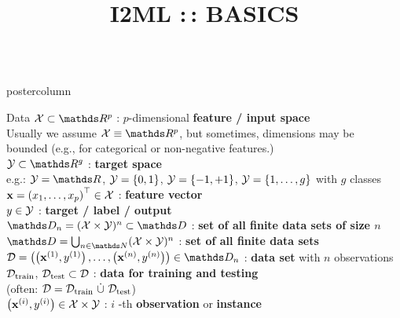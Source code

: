 \documentclass{beamer}
\title{I2ML :\,: BASICS} %
\newlength{\columnheight} %
\begin{document}
\begin{frame}[fragile]{}
\vspace{-8ex}
\begin{columns}
	\begin{column}{.31\textwidth}
		\begin{beamercolorbox}[center]{postercolumn}
			\begin{minipage}{.98\textwidth}
				\parbox[t][\columnheight]{\textwidth}{
\begin{myblock}{Data}
 $\Xspace \subset \R^p$ : $p$-dimensional \textbf{feature / input space}\\ 
Usually we assume $\Xspace \equiv \R^p$, but sometimes, dimensions may be \\  
bounded (e.g., for categorical or non-negative features.)    \\

$\Yspace \subset \R^g$ : \textbf{target space} \\ 
e.g.: $\Yspace = \R$, $\mathcal{Y} = \{0, 1\}$, $\mathcal{Y} = \{-1, +1\}$, $\mathcal{Y} = \{1, \ldots, g\}$ with $g$ classes\\

$\mathbf{x} = \left(x_1, \ldots, x_p\right)^\top \in \mathcal{X}$ : \textbf{feature vector} \\ 
 
$y \in \mathcal{Y}$ : \textbf{target / label / output} \\
 
$\allDatasetsn = \defAllDatasetsn \subset \allDatasets$ : \textbf{set of all finite data sets of size $n$} \\

$\allDatasets = \defAllDatasets$ : \textbf{set of all finite data sets} \\
 
$\D = \Dset \in \allDatasetsn $ : \textbf{data set} with $n$ observations \\
 
$\mathcal{D}_{\text{train}}$, $\mathcal{D}_{\text{test}} \subset \mathcal{D}$ : \textbf{data for training and testing} \\ 
(often: $\mathcal{D} = \mathcal{D}_{\text{train}} ~ \dot{\cup} ~ \mathcal{D}_{\text{test}}$)\\
 
$\left(\mathbf{x}^{(i)}, y^{(i)}\right) \in \mathcal{X}\times \mathcal{Y}$ : $i$ -th \textbf{observation} or \textbf{instance} \\
 

\end{myblock}}
\end{minipage}
\end{beamercolorbox}
\end{column}
\end{columns}
\end{frame}
\end{document}
